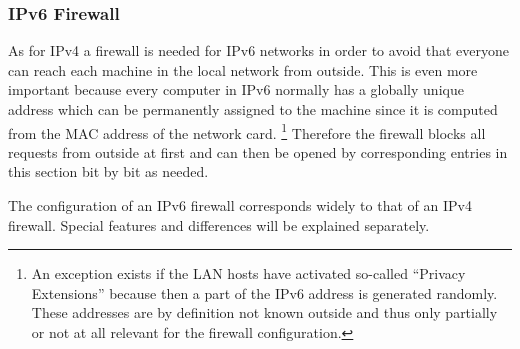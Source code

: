 \subsubsection{IPv6 Firewall}

As for IPv4 a firewall is needed for IPv6 networks in order to avoid that everyone 
can reach each machine in the local network from outside. This is even more 
important because every computer in IPv6 normally has a globally unique address 
which can be permanently assigned to the machine since it is computed from the 
MAC address of the network card. \footnote {An exception exists if the LAN hosts 
have activated so-called ``Privacy Extensions'' because then a part of the IPv6 
address is generated randomly. These addresses are by definition not known 
outside and thus only partially or not at all relevant for the firewall configuration.} 
Therefore the firewall blocks all requests from outside at first and can then 
be opened by corresponding entries in this section bit by bit as needed.

The configuration of an IPv6 firewall corresponds widely to that of an IPv4 
firewall. Special features and differences will be explained separately.

